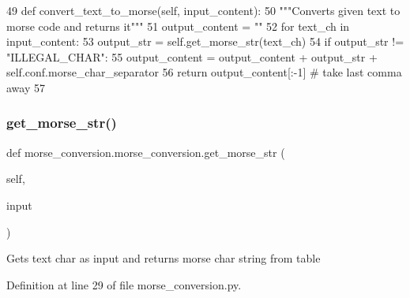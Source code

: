 \begin{DoxyCode}
49     \textcolor{keyword}{def }convert\_text\_to\_morse(self, input\_content):
50         \textcolor{stringliteral}{"""Converts given text to morse code and returns it"""}
51         output\_content = \textcolor{stringliteral}{""}
52         \textcolor{keywordflow}{for} text\_ch \textcolor{keywordflow}{in} input\_content:
53             output\_str = self.get\_morse\_str(text\_ch)
54             \textcolor{keywordflow}{if} output\_str != \textcolor{stringliteral}{"ILLEGAL\_CHAR"}:
55                 output\_content = output\_content + output\_str + self.conf.morse\_char\_separator
56         \textcolor{keywordflow}{return} output\_content[:-1]  \textcolor{comment}{# take last comma away}
57 
\end{DoxyCode}
\mbox{\label{classmorse__conversion_1_1morse__conversion_a47073274e46c3a138d46f0163a413582}} 
\subsubsection{\texorpdfstring{get\+\_\+morse\+\_\+str()}{get\_morse\_str()}}
{\footnotesize\ttfamily def morse\+\_\+conversion.\+morse\+\_\+conversion.\+get\+\_\+morse\+\_\+str (\begin{DoxyParamCaption}\item[{}]{self,  }\item[{}]{input }\end{DoxyParamCaption})}

\begin{DoxyVerb}Gets text char as input and returns morse char string from table\end{DoxyVerb}
 

Definition at line 29 of file morse\+\_\+conversion.\+py.


